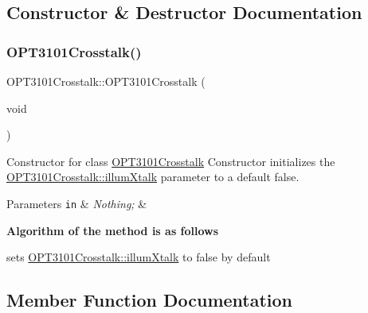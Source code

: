 \subsection{Constructor \& Destructor Documentation}
\mbox{\label{class_o_p_t3101_crosstalk_ad983772d96c500ea16d5aa01dd03ce6d}} 
\subsubsection{\texorpdfstring{O\+P\+T3101\+Crosstalk()}{OPT3101Crosstalk()}}
{\footnotesize\ttfamily O\+P\+T3101\+Crosstalk\+::\+O\+P\+T3101\+Crosstalk (\begin{DoxyParamCaption}\item[{void}]{ }\end{DoxyParamCaption})}



Constructor for class \mbox{\hyperlink{class_o_p_t3101_crosstalk}{O\+P\+T3101\+Crosstalk}} Constructor initializes the \mbox{\hyperlink{class_o_p_t3101_crosstalk_ac34c766af7381d501b1716fd8a0076db}{O\+P\+T3101\+Crosstalk\+::illum\+Xtalk}} parameter to a default false. 


\begin{DoxyParams}[1]{Parameters}
\mbox{\tt in}  & {\em Nothing;} & \\
\hline
\end{DoxyParams}
{\bfseries Algorithm of the method is as follows}


\begin{DoxyItemize}
\item sets \mbox{\hyperlink{class_o_p_t3101_crosstalk_ac34c766af7381d501b1716fd8a0076db}{O\+P\+T3101\+Crosstalk\+::illum\+Xtalk}} to false by default 
\end{DoxyItemize}

\subsection{Member Function Documentation}
\mbox{\label{class_o_p_t3101_crosstalk_a6646bcfb7cc1de3a3952ff7368f168ba}} 
